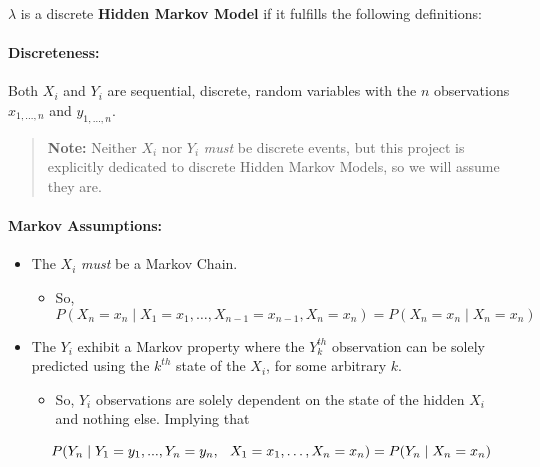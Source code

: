\documentclass[
]{book}
\providecommand{\tightlist}{%
  \setlength{\itemsep}{0pt}\setlength{\parskip}{0pt}}
\begin{document}
\(\lambda\) is a discrete \textbf{Hidden Markov Model} if it fulfills the following definitions:

\hypertarget{discreteness}{%
\paragraph*{Discreteness:}\label{discreteness}}

Both \(X_i\) and \(Y_i\) are sequential, discrete, random variables with the \(n\) observations \(x_{1,\dots, n}\) and \(y_{1,\dots, n}\).

\begin{quote}
\textbf{Note:} Neither \(X_i\) nor \(Y_i\) \emph{must} be discrete events, but this project is explicitly dedicated to discrete Hidden Markov Models, so we will assume they are.
\end{quote}

\hypertarget{markov-assumptions}{%
\paragraph*{Markov Assumptions:}\label{markov-assumptions}}

\begin{itemize}
\tightlist
\item
  The \(X_i\) \emph{must} be a Markov Chain.

  \begin{itemize}
  \tightlist
  \item
    So, \[P(X_{n} = x_{n} \mid X_1 = x_1, \dots,  X_{n-1}= x_{n-1}, X_n= x_{n}) = P(X_{n} = x_{n} \mid X_n = x_n)\]
  \end{itemize}
\item
  The \(Y_i\) exhibit a Markov property where the \(Y_k^{th}\) observation can be solely predicted using the \(k^{th}\) state of the \(X_i\), for some arbitrary \(k\).

  \begin{itemize}
  \tightlist
  \item
    So, \(Y_i\) observations are solely dependent on the state of the hidden \(X_i\) and nothing else. Implying that
  \end{itemize}

  \[P(Y_{n} \mid Y_1 = y_1, ..., Y_{n} = y_n, \hspace{.1 in} X_1 = x_1, \dots, X_n= x_{n}) = P(Y_{n}\mid X_{n} = x_{n})\]
\end{itemize}
\end{document}
